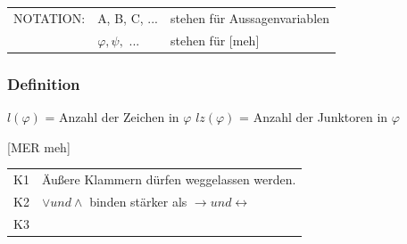 \documentclass[12pt,a4paper]{article} %
\begin{document}
\begin{tabular}{l l l}
	NOTATION: & A, B, C, ... & stehen für Aussagenvariablen \\
	& $\varphi, \psi,$ ... & stehen für [meh]
\end{tabular}

\subsubsection{Definition}
$l(\varphi)$ = Anzahl der Zeichen in $\varphi$ \newline
$lz(\varphi)$ = Anzahl der Junktoren in $\varphi$

[MER meh]

\begin{tabular}{l l}
	K1 & Äußere Klammern dürfen weggelassen werden. \\
	K2 & $\vee und \wedge$ binden stärker als $\rightarrow und \leftrightarrow$ \\
	K3 & 
\end{tabular}
\end{document}
